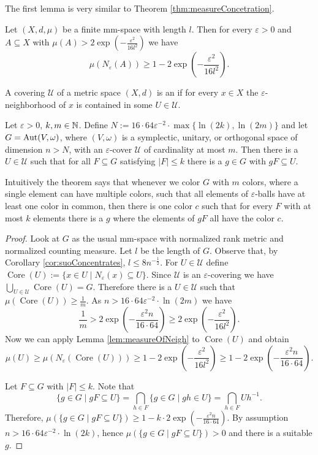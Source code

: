 The first lemma is very similar to Theorem \ref{thm:measureConcetration}.
\begin{lemma}\label{lem:measureOfNeigh}
	Let $(X,d,\mu)$ be a finite mm-space with length $l$. Then for every $\varepsilon>0$ and $A\subseteq X$ with $\mu(A)>2\exp\left(-\frac{\varepsilon^2}{16l^2}\right)$ we have
	\[\mu(N_\varepsilon(A))\geq 1-2\exp\left(-\frac{\varepsilon^2}{16l^2}\right).\]
\end{lemma}
		
		
A covering $\mathcal{U}$ of a metric space $(X,d)$ is an  if for every $x\in X$ the $\varepsilon$-neighborhood of $x$ is contained in some $U\in\mathcal{U}$.
		
\begin{theorem}
	Let $\varepsilon>0$, $k,m\in\mathbb{N}$. Define $N:=16\cdot64\varepsilon^{-2}\cdot\max\{\ln(2k),\ln(2m)\}$ and let $G=\operatorname{Aut}(V,\omega)$, where $(V,\omega)$ is a symplectic, unitary, or orthogonal space of dimension $n>N$, with an $\varepsilon$-cover $\mathcal{U}$ of cardinality at most $m$. Then there is a $U\in\mathcal{U}$ such that for all $F\subseteq G$ satisfying $|F|\leq k$ there is a $g\in G$ with $gF\subseteq U$.
\end{theorem}
Intuitively the theorem says that whenever we color $G$ with $m$ colors, where a single element can have multiple colors, such that all elements of $\varepsilon$-balls have at least one color in common, then there is one color $c$ such that for every $F$ with at most $k$ elements there is a $g$ where the elements of $gF$ all have the color $c$.
\begin{proof}
	\def\core{\operatorname{Core}}
	Look at $G$ as the usual mm-space with normalized rank metric and normalized counting measure.
	Let $l$ be the length of $G$. Observe that, by Corollary \ref{cor:suoConcentrates}, $l\leq 8n^{-\frac{1}{2}}$.
	For $U\in \mathcal{U}$ define $\core(U):=\{x\in U\mid N_\varepsilon(x)\subseteq U\}$. Since $\mathcal{U}$ is an $\varepsilon$-covering we have $\bigcup_{U\in\mathcal{U}}\core(U)=G$. Therefore there is a $U\in\mathcal{U}$ such that $\mu(\core(U))\geq\frac{1}{m}$. As $n>16\cdot64\varepsilon^{-2}\cdot\ln(2m)$ we have
	\[\frac{1}{m}>2\exp\left(-\frac{\varepsilon^2n}{16\cdot64}\right)\geq 2\exp\left(-\frac{\varepsilon^2}{ 16l^2}\right).\]
	Now we can apply Lemma \ref{lem:measureOfNeigh} to $\core(U)$ and obtain
	\[\mu(U)\geq\mu(N_\varepsilon(\core(U)))\geq 1-2\exp\left(-\frac{\varepsilon^2}{ 16l^2}\right)\geq1-2\exp\left(-\frac{\varepsilon^2n}{16\cdot64}\right). \]
				
	Let $F\subseteq G$ with $|F|\leq k$. Note that 
	\[\{g\in G\mid gF\subseteq U\}=\bigcap_{h\in F}\{g\in G\mid gh\in U\}=\bigcap_{h\in F}Uh^{-1}.\]
	Therefore, $\mu(\{g\in G\mid gF\subseteq U\})\geq 1-k\cdot2\exp\left(-\frac{\varepsilon^2n}{16\cdot64}\right)$. By assumption $n>16\cdot64\varepsilon^{-2}\cdot\ln(2k)$, hence $\mu(\{g\in G\mid gF\subseteq U\})>0$ and there is a suitable $g$. 
\end{proof}
		
		
